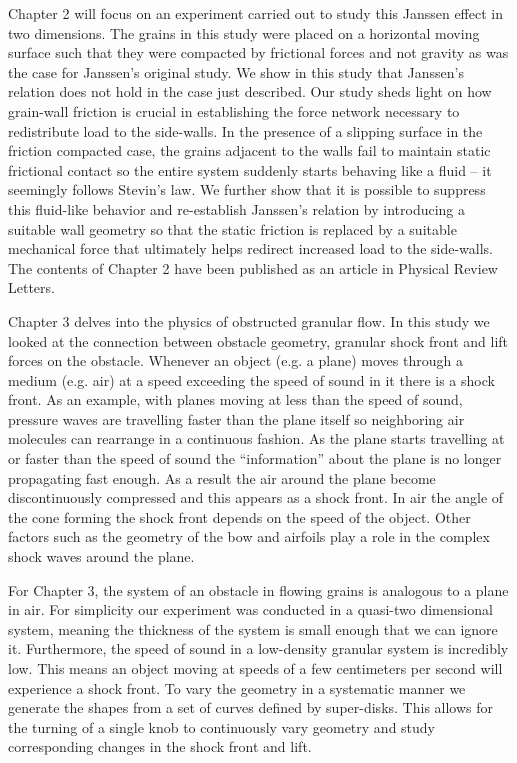 Chapter 2 will focus on an experiment carried out to study this Janssen effect in two dimensions. The grains in this study were placed on a horizontal moving surface such that they were compacted by frictional forces and not gravity as was the case for Janssen’s original study. We show in this study that Janssen’s relation does not hold in the case just described. Our study sheds light on how grain-wall friction is crucial in establishing the force network necessary to redistribute load to the side-walls. In the presence of a slipping surface in the friction compacted case, the grains adjacent to the walls fail to maintain static frictional contact so the entire system suddenly starts behaving like a fluid – it seemingly follows Stevin’s law. We further show that it is possible to suppress this fluid-like behavior and re-establish Janssen’s relation by introducing a suitable wall geometry so that the static friction is replaced by a suitable mechanical force that ultimately helps redirect increased load to the side-walls. The contents of Chapter 2 have been published as an article in Physical Review Letters. 

Chapter 3 delves into the physics of obstructed granular flow. In this study we looked at the connection between obstacle geometry, granular shock front and lift forces on the obstacle. Whenever an object (e.g. a plane) moves through a medium (e.g. air) at a speed exceeding the speed of sound in it there is a shock front. As an example, with planes moving at less than the speed of sound, pressure waves are travelling faster than the plane itself so neighboring air molecules can rearrange in a continuous fashion. As the plane starts travelling at or faster than the speed of sound the “information” about the plane is no longer propagating fast enough. As a result the air around the plane become discontinuously compressed and this appears as a shock front. In air the angle of the cone forming the shock front depends on the speed of the object. Other factors such as the geometry of the bow and airfoils play a role in the complex shock waves around the plane. 

For Chapter 3, the system of an obstacle in flowing grains is analogous to a plane in air. For simplicity our experiment was conducted in a quasi-two dimensional system, meaning the thickness of the system is small enough that we can ignore it. Furthermore, the speed of sound in a low-density granular system is incredibly low. This means an object moving at speeds of a few centimeters per second will experience a shock front. To vary the geometry in a systematic manner we generate the shapes from a set of curves defined by super-disks. This allows for the turning of a single knob to continuously vary geometry and study corresponding changes in the shock front and lift. 

